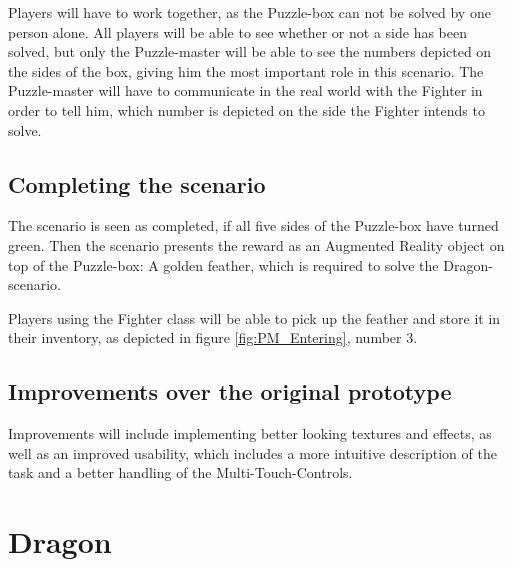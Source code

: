 \documentclass{sigchi-ext}
\begin{document}
Players will have to work together, as the Puzzle-box can not be solved by one person alone. All players will be able to see whether or not a side has been solved, but only the Puzzle-master will be able to see the numbers depicted on the sides of the box, giving him the most important role in this scenario. The Puzzle-master will have to communicate in the real world with the Fighter in order to tell him, which number is depicted on the side the Fighter intends to solve.

\subsection{Completing the scenario}

The scenario is seen as completed, if all five sides of the Puzzle-box have turned green. Then the scenario presents the reward as an Augmented Reality object on top of the Puzzle-box: A golden feather, which is required to solve the Dragon-scenario.

Players using the Fighter class will be able to pick up the feather and store it in their inventory, as depicted in figure \ref{fig:PM_Entering}, number 3.

\subsection{Improvements over the original prototype}

Improvements will include implementing better looking textures and effects, as well as an improved usability, which includes a more intuitive description of the task and a better handling of the Multi-Touch-Controls.

\section{Dragon}
\end{document}
